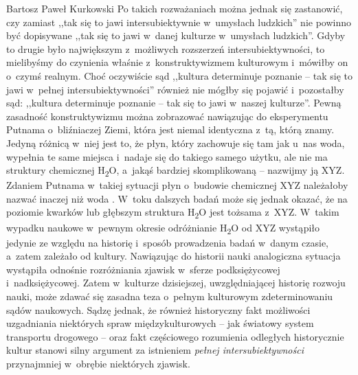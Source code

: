 \begin{artplenv}{Bartosz Paweł Kurkowski}
Po takich rozważaniach można jednak się zastanowić, czy zamiast ,,tak się to jawi intersubiektywnie w~umysłach ludzkich''
nie powinno być dopisywane ,,tak się to jawi w~danej kulturze w~umysłach ludzkich''. Gdyby to drugie było
największym z~możliwych rozszerzeń intersubiektywności, to mielibyśmy do czynienia właśnie z~konstruktywizmem kulturowym
i~mówiłby on o~czymś realnym. Choć oczywiście sąd ,,kultura determinuje poznanie -- tak się to jawi w~pełnej intersubiektywności''
również nie mógłby się pojawić i~pozostałby sąd: ,,kultura determinuje poznanie -- tak się to jawi w~naszej kulturze''.
Pewną zasadność konstruktywizmu można zobrazować nawiązując do eksperymentu Putnama o~bliźniaczej Ziemi, która jest
niemal identyczna z~tą, którą znamy. Jedyną różnicą w~niej jest to, że płyn, który zachowuje się tam jak u~nas woda,
wypełnia te same miejsca i~nadaje się do takiego samego użytku, ale nie ma struktury chemicznej H\textsubscript{2}O,
a~jakąś bardziej skomplikowaną -- nazwijmy ją XYZ. Zdaniem Putnama w~takiej sytuacji płyn o~budowie chemicznej XYZ
należałoby nazwać inaczej niż woda
\parencite[s.~61]{grobler_prawda_2000}.
W~toku dalszych badań może się
jednak okazać, że na poziomie kwarków lub głębszym struktura H\textsubscript{2}O jest tożsama z~XYZ. W~takim wypadku
naukowe w~pewnym okresie odróżnianie H\textsubscript{2}O od XYZ wystąpiło jedynie ze względu na historię i~sposób
prowadzenia badań w~danym czasie, a~zatem zależało od kultury. Nawiązując do historii nauki analogiczna sytuacja
wystąpiła odnośnie rozróżniania zjawisk w~sferze podksiężycowej i~nadksiężycowej. Zatem w~kulturze dzisiejszej,
uwzględniającej historię rozwoju nauki, może zdawać się zasadna teza o~pełnym kulturowym zdeterminowaniu sądów
naukowych. Sądzę jednak, że również historyczny fakt możliwości uzgadniania niektórych spraw międzykulturowych -- jak
światowy system transportu drogowego -- oraz fakt częściowego rozumienia odległych historycznie kultur stanowi silny
argument za istnieniem \textit{pełnej intersubiektywności} przynajmniej w~obrębie niektórych zjawisk.



\end{artplenv}

